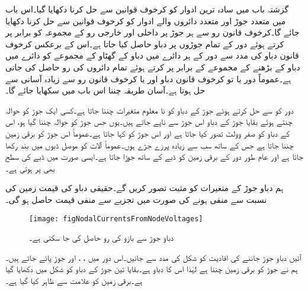گزشتہ باب میں سادہ ترین ادوار کو کرخوف قوانین سے حل کرنا دکھایا گیا۔اس باب میں متعدد جوڑ اور متعدد دائروں والے ادوار کو کرخوف قوانین سے حل کرنا دکھایا جائے گا۔کرخوف قانون رو سے ہر جوڑ پر داخلی اور خارجی رو کے مجموعہ کو برابر پر کرتے ہوئے دور کے تمام جوڑوں پر دباو حاصل کیا جاتا ہے۔اس کے برعکس کرخوف قانون دباو کی مدد سے دور کے ہر دائرے میں دباو کے گھٹاو کے مجموعے کو دائرے میں دباو کے  بڑھنے کے مجموعے کے برابر پر کرتے ہوئے تمام دائروں کی رو حاصل کی جاتی ہے۔عموماً  دور یا تو کرخوف قانون دباو اور یا کرخوف قانون رو سے زیادہ آسانی سے حل ہوتا ہے۔آسان طریقہ چننا اس باب میں سکھایا جائے گا۔

دور کو  سے حل کرتے ہوئے  جوڑ کے دباو کو  نا معلوم متغیرات چننا جاتا ہے۔کسی ایک جوڑ کو حوالہ چنتے ہوئے بقایا جوڑ کے دباو اس جوڑ سے ناپے جاتے ہیں۔یوں جس جوڑ کو حوالہ چننا گیا ہو، اس کے دباو کو صفر وولٹ تصور کیا جاتا ہے اور اس جوڑ کو   کہا جاتا ہے۔عموماً اس جوڑ کو برقی زمین چننا جاتا ہے جس کے ساتھ سب سے زیادہ پرزے جڑے ہوں۔عموماً آلات کو موصل ڈبوں میں بند رکھا جاتا ہے اور عام طور دور کے برقی زمین کو ڈبے کے ساتھ جوڑا جاتا ہے۔ایسی صورت میں ڈبے کی سطح  بھی  پر ہوتی ہے۔

ہم دباو جوڑ کے متغیرات کو مثبت تصور کریں گے۔حقیقی دباو کی قیمت زمین کی نسبت سے منفی ہونے کی صورت میں تجزیے سے منفی قیمت حاصل ہو گی۔ 

\begin{figure}
\centering
\texttt{[image: figNodalCurrentsFromNodeVoltages]}
\caption{دباو جوڑ سے بازو کی رو حاصل کی جا سکتی ہے۔}
\label{شکل_جوڑ_دباو__جوڑ_سے_رو_کا_حصول}
\end{figure}%

آئیں دباو جوڑ جاننے کی افادیت کو  شکل  کی مدد سے جانیں۔اس دور میں ، ،  اور  جوڑ پائے جاتے ہیں۔ہم نے جوڑ  کو برقی زمین چننا ہے لہٰذا اس کا دباو  ہے۔بقایا تین جوڑ کے دباو کو شکل میں دکھایا گیا ہے۔برقی زمین کو علامت سے ظاہر کیا گیا ہے۔

